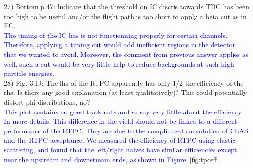 27) Bottom p.47: Indicate that the threshold on IC discris towards TDC has been 
too high to be useful and/or the flight path is too short to apply a beta cut 
as in EC.\\
\textcolor{blue}{
 The timing of the IC has is not functionning properly for certain channels. Therefore, 
 applying a timing cut would add inefficient regions in the detector that we 
 wanted to avoid. Moreover, the comment from previous answer applies as well,
such a cut would be very little help to reduce backgrounds at such high particle energies.}\\

28) Fig. 3.19:  The lhs of the RTPC apparently has only 1/2 the efficiency of the 
rhs. Is there any good explanation (at least qualitatively)? This could 
potentially distort phi-distributions, no? \\
\textcolor{blue}{This plot contains no good
   track cuts and so say very little about the efficiency. In more details, 
   This difference in the yield should not be linked to a different performance 
   of the RTPC.  They are due to the complicated convolution of CLAS and the 
   RTPC acceptance.  We measured the efficiency of RTPC using elastic 
scattering, and found that the left/right halves have similar efficiencies 
except near the upstream and downstream ends, as shown in 
Figure~\ref{fig:tpceff}.} \\

